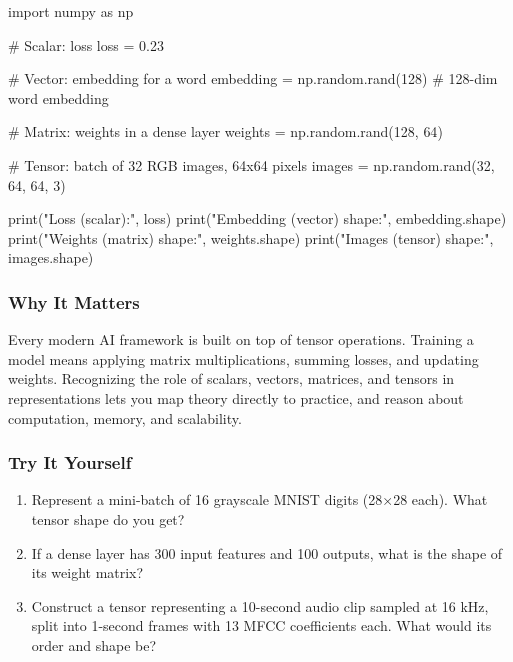 \documentclass[
  letterpaper,
  DIV=11,
  numbers=noendperiod]{scrreprt}
\newenvironment{Shaded}{\begin{snugshade}}{\end{snugshade}}
\newcommand{\BuiltInTok}[1]{\textcolor[rgb]{0.00,0.23,0.31}{#1}}
\newcommand{\CommentTok}[1]{\textcolor[rgb]{0.37,0.37,0.37}{#1}}
\newcommand{\DecValTok}[1]{\textcolor[rgb]{0.68,0.00,0.00}{#1}}
\newcommand{\FloatTok}[1]{\textcolor[rgb]{0.68,0.00,0.00}{#1}}
\newcommand{\ImportTok}[1]{\textcolor[rgb]{0.00,0.46,0.62}{#1}}
\newcommand{\NormalTok}[1]{\textcolor[rgb]{0.00,0.23,0.31}{#1}}
\newcommand{\OperatorTok}[1]{\textcolor[rgb]{0.37,0.37,0.37}{#1}}
\newcommand{\StringTok}[1]{\textcolor[rgb]{0.13,0.47,0.30}{#1}}
\providecommand{\tightlist}{%
  \setlength{\itemsep}{0pt}\setlength{\parskip}{0pt}}
\begin{document}
\begin{Shaded}
\begin{Highlighting}[]
\ImportTok{import}\NormalTok{ numpy }\ImportTok{as}\NormalTok{ np}

\CommentTok{\# Scalar: loss}
\NormalTok{loss }\OperatorTok{=} \FloatTok{0.23}

\CommentTok{\# Vector: embedding for a word}
\NormalTok{embedding }\OperatorTok{=}\NormalTok{ np.random.rand(}\DecValTok{128}\NormalTok{)  }\CommentTok{\# 128{-}dim word embedding}

\CommentTok{\# Matrix: weights in a dense layer}
\NormalTok{weights }\OperatorTok{=}\NormalTok{ np.random.rand(}\DecValTok{128}\NormalTok{, }\DecValTok{64}\NormalTok{)}

\CommentTok{\# Tensor: batch of 32 RGB images, 64x64 pixels}
\NormalTok{images }\OperatorTok{=}\NormalTok{ np.random.rand(}\DecValTok{32}\NormalTok{, }\DecValTok{64}\NormalTok{, }\DecValTok{64}\NormalTok{, }\DecValTok{3}\NormalTok{)}

\BuiltInTok{print}\NormalTok{(}\StringTok{"Loss (scalar):"}\NormalTok{, loss)}
\BuiltInTok{print}\NormalTok{(}\StringTok{"Embedding (vector) shape:"}\NormalTok{, embedding.shape)}
\BuiltInTok{print}\NormalTok{(}\StringTok{"Weights (matrix) shape:"}\NormalTok{, weights.shape)}
\BuiltInTok{print}\NormalTok{(}\StringTok{"Images (tensor) shape:"}\NormalTok{, images.shape)}
\end{Highlighting}
\end{Shaded}

\subsubsection{Why It Matters}\label{why-it-matters-7}

Every modern AI framework is built on top of tensor operations. Training
a model means applying matrix multiplications, summing losses, and
updating weights. Recognizing the role of scalars, vectors, matrices,
and tensors in representations lets you map theory directly to practice,
and reason about computation, memory, and scalability.

\subsubsection{Try It Yourself}\label{try-it-yourself-109}

\begin{enumerate}
\def\labelenumi{\arabic{enumi}.}
\tightlist
\item
  Represent a mini-batch of 16 grayscale MNIST digits (28×28 each). What
  tensor shape do you get?
\item
  If a dense layer has 300 input features and 100 outputs, what is the
  shape of its weight matrix?
\item
  Construct a tensor representing a 10-second audio clip sampled at 16
  kHz, split into 1-second frames with 13 MFCC coefficients each. What
  would its order and shape be?
\end{enumerate}
\end{document}
